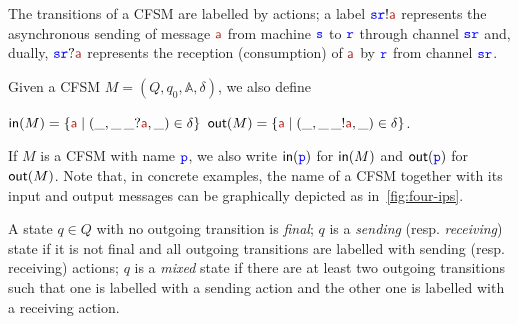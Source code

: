 

The transitions of a CFSM are labelled by actions; a label $\tts\ttr!\msg[a]$ represents
the asynchronous sending of message $\msg[a]$ from machine ${\mathtt{\color{blue}{ {s}}}}$ to ${\mathtt{\color{blue}{ {r}}}}$ through channel ${\mathtt{\color{blue}{ {s}}}}{\mathtt{\color{blue}{ {r}}}}$ and, dually,
$\tts\ttr?\msg[a]$ represents the reception (consumption) of $\msg[a]$ by ${\mathtt{\color{blue}{ {r}}}}$ from channel
${\mathtt{\color{blue}{ {s}}}}{\mathtt{\color{blue}{ {r}}}}$. 

 Given a CFSM $M=(Q,q_0,\mathbb{A},\delta)$,
we also define \\
\centerline{$\inn{M}=\Set{\msg[a] \mid (\_,\_\,\_?\msg[a],\_)\in \delta }$
\quad {}\quad $\outt{M}=\Set{\msg[a] \mid (\_,\_\,\_!\msg[a],\_)\in \delta }$.}
 If $M$ is a CFSM with name ${\mathtt{\color{blue}{ {p}}}}$, we also write $\mathsf{in}({\mathtt{\color{blue}{ {p}}}})$ for $\mathsf{in}(M)$ and
 $\mathsf{out}({\mathtt{\color{blue}{ {p}}}})$ for $\mathsf{out}(M)$.
  Note that, in concrete examples, the name of a CFSM together with its input and output messages can be graphically depicted as in~\cref{fig:four-ips}. 




A state
$q\in Q$ with no outgoing transition is {\em final}; 
$q$ is a {\em sending} (resp. {\em receiving}) state if it is not final and
all outgoing transitions are labelled with sending (resp. receiving) actions;
$q$  is a {\em mixed} state if there are at least two outgoing transitions such that one is labelled with a sending action and the other one is labelled with a receiving action.



